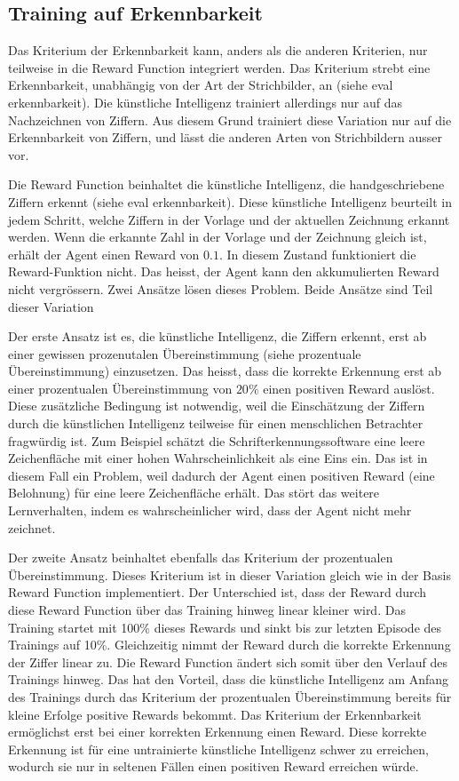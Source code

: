 \subsection{Training auf Erkennbarkeit}
Das Kriterium der Erkennbarkeit kann, anders als die anderen Kriterien, nur
teilweise in die Reward Function integriert werden. Das Kriterium strebt eine
Erkennbarkeit, unabhängig von der Art der Strichbilder, an (siehe eval
erkennbarkeit). Die künstliche Intelligenz trainiert allerdings nur auf das
Nachzeichnen von Ziffern. Aus diesem Grund trainiert diese Variation nur auf die
Erkennbarkeit von Ziffern, und lässt die anderen Arten von Strichbildern ausser
vor. 

Die Reward Function beinhaltet die künstliche Intelligenz, die handgeschriebene
Ziffern erkennt (siehe eval erkennbarkeit). Diese künstliche Intelligenz
beurteilt in jedem Schritt, welche Ziffern in der Vorlage und der aktuellen
Zeichnung erkannt werden. Wenn die erkannte Zahl in der Vorlage und der
Zeichnung gleich ist, erhält der Agent einen Reward von $0.1$. In diesem Zustand     %
funktioniert die Reward-Funktion nicht. Das heisst, der Agent kann den
akkumulierten Reward nicht vergrössern. Zwei Ansätze lösen dieses Problem. Beide
Ansätze sind Teil dieser Variation

Der erste Ansatz ist es, die künstliche Intelligenz, die Ziffern erkennt, erst
ab einer gewissen prozenutalen Übereinstimmung (siehe prozentuale
Übereinstimmung) einzusetzen. Das heisst, dass die korrekte Erkennung erst ab
einer prozentualen Übereinstimmung von $20\%$ einen positiven Reward auslöst.
Diese zusätzliche Bedingung ist notwendig, weil die Einschätzung der Ziffern
durch die künstlichen Intelligenz teilweise für einen menschlichen Betrachter
fragwürdig ist. Zum Beispiel schätzt die Schrifterkennungssoftware eine leere
Zeichenfläche mit einer hohen Wahrscheinlichkeit als eine Eins ein. Das ist in
diesem Fall ein Problem, weil dadurch der Agent einen positiven Reward (eine
Belohnung) für eine leere Zeichenfläche erhält. Das stört das weitere
Lernverhalten, indem es wahrscheinlicher wird, dass der Agent nicht mehr
zeichnet. 

Der zweite Ansatz beinhaltet ebenfalls das Kriterium der prozentualen
Übereinstimmung. Dieses Kriterium ist in dieser Variation gleich wie in der
Basis Reward Function implementiert. Der Unterschied ist, dass der Reward durch
diese Reward Function über das Training hinweg linear kleiner wird. Das Training
startet mit 100\% dieses Rewards und sinkt bis zur letzten Episode des Trainings
auf 10\%. Gleichzeitig nimmt der Reward durch die korrekte Erkennung der Ziffer
linear zu. Die Reward Function ändert sich somit über den Verlauf des Trainings
hinweg. Das hat den Vorteil, dass die künstliche Intelligenz am Anfang des
Trainings durch das Kriterium der prozentualen Übereinstimmung bereits für
kleine Erfolge positive Rewards bekommt. Das Kriterium der Erkennbarkeit
ermöglichst erst bei einer korrekten Erkennung einen Reward. Diese korrekte
Erkennung ist für eine untrainierte künstliche Intelligenz schwer zu erreichen,
wodurch sie nur in seltenen Fällen einen positiven Reward erreichen würde.


